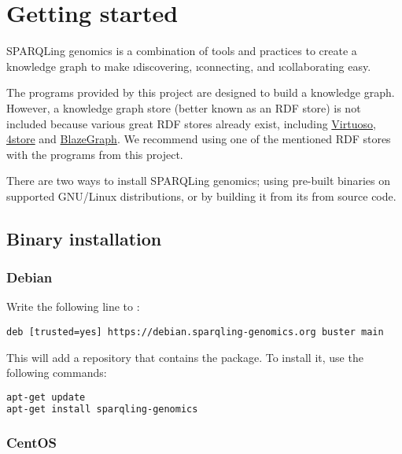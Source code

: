 \chapter{Getting started}

  SPARQLing genomics is a combination of tools and practices to create a
  knowledge graph to make \i{discovering}, \i{connecting}, and
  \i{collaborating} easy.

  The programs provided by this project are designed to build a knowledge graph.
  However, a knowledge graph store (better known as an RDF store) is not included
  because various great RDF stores already exist, including
  \href{https://virtuoso.openlinksw.com/}{Virtuoso},
  \href{https://github.com/4store/4store}{4store} and
  \href{https://www.blazegraph.com/}{BlazeGraph}.  We recommend using one of
  the mentioned RDF stores with the programs from this project.

  There are two ways to install SPARQLing genomics; using pre-built binaries
  on supported GNU/Linux distributions, or by building it from its from source
  code.

\section{Binary installation}
\label{sec:binary-installation}

\subsection{Debian}

  Write the following line to :


\begin{lstlisting}
deb [trusted=yes] https://debian.sparqling-genomics.org buster main
\end{lstlisting}

  This will add a repository that contains the 
  package.  To install it, use the following commands:

\begin{lstlisting}[language=bash]
apt-get update
apt-get install sparqling-genomics
\end{lstlisting}

\subsection{CentOS}

